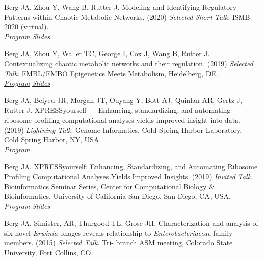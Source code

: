 \documentclass[margin,line]{res}
\begin{document}
\begin{resume}
Berg JA, Zhou Y, Wang B, Rutter J. Modeling and Identifying Regulatory Patterns within Chaotic Metabolic Networks. (2020) \textit{Selected Short Talk}. ISMB 2020 (virtual). \\
\hspace*{12pt} \textit{\href{https://www.iscb.org/cms_addon/conferences/ismb2020/tracks/netbiocosi}{Program}}
\hspace*{12pt} \textit{\href{https://github.com/j-berg/presentations/blob/master/ISMB-2020/2020-07-16_ISMB-2020_Metaboverse.pdf}{Slides}}

Berg JA, Zhou Y, Waller TC, George I, Cox J, Wang B, Rutter J. Contextualizing chaotic metabolic networks and their regulation. (2019) \textit{Selected Talk}. EMBL/EMBO Epigenetics Meets Metabolism, Heidelberg, DE. \\
\hspace*{12pt} \textit{\href{https://www.embo-embl-symposia.org/symposia/2019/EES19-11/programme/index.html}{Program}}
\hspace*{12pt} \textit{\href{https://github.com/j-berg/presentations/blob/master/22_nov_2019_metabolism_meets_epigenetics_metaboverse.pdf}{Slides}}

Berg JA, Belyeu JR, Morgan JT, Ouyang Y, Bott AJ, Quinlan AR, Gertz J, Rutter J. XPRESSyourself — Enhancing, standardizing, and automating ribosome profiling computational analyses yields improved insight into data. (2019) \textit{Lightning Talk}. Genome Informatics, Cold Spring Harbor Laboratory, Cold Spring Harbor, NY, USA. \\
\hspace*{12pt} \textit{\href{https://meetings.cshl.edu/abstracts.aspx?meet=INFO&year=19}{Program}}

Berg JA. XPRESSyourself: Enhancing, Standardizing, and Automating Ribosome Profiling Computational Analyses Yields Improved Insights. (2019) \textit{Invited Talk}. Bioinformatics Seminar Series, Center for Computational Biology \& Bioinformatics, University of California San Diego, San Diego, CA, USA. \\
\hspace*{12pt} \textit{\href{http://compbio.ucsd.edu/outreach/bioinformatics-seminar-series/}{Program}}
\hspace*{12pt} \textit{\href{https://github.com/j-berg/presentations/blob/master/07_oct_2019_ucsd_ccbb_xpressyourself.pdf}{Slides}}

Berg JA, Simister, AR, Thurgood TL, Grose JH. Characterization and analysis of six novel \textit{Erwinia} phages reveals relationship to \textit{Enterobacteriaceae} family members. (2015) \textit{Selected Talk}. Tri- branch ASM meeting, Colorado State University, Fort Collins, CO.



\end{resume}
\end{document}
